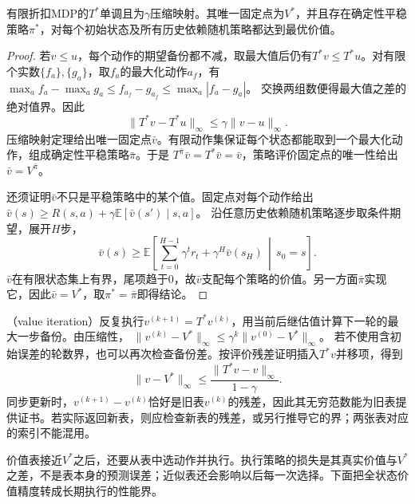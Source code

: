 \begin{theorem}[最优固定点与平稳最优策略]
 \label{thm:rl-planning-optimal-fixed-point}
 有限折扣MDP的$T^*$单调且为$\gamma$压缩映射。其唯一固定点为$V^*$，并且存在确定性平稳策略$\pi^*$，对每个初始状态及所有历史依赖随机策略都达到最优价值。
\end{theorem}
\begin{proof}
 若$v\leq u$，每个动作的期望备份都不减，取最大值后仍有$T^*v\leq T^*u$。对有限个实数$\{f_a\},\{g_a\}$，取$f_a$的最大化动作$a_f$，有
 $\max_a f_a-\max_a g_a\leq f_{a_f}-g_{a_f}\leq\max_a|f_a-g_a|$。
 交换两组数便得最大值之差的绝对值界。因此
 \[
 \lVert T^*v-T^*u\rVert_\infty
 \leq\gamma\lVert v-u\rVert_\infty.
 \]
 压缩映射定理给出唯一固定点$\bar v$。有限动作集保证每个状态都能取到一个最大化动作，组成确定性平稳策略$\bar\pi$。于是
 $T^{\bar\pi}\bar v=T^*\bar v=\bar v$，策略评价固定点的唯一性给出$\bar v=V^{\bar\pi}$。

 还须证明$\bar v$不只是平稳策略中的某个值。固定点对每个动作给出
 $\bar v(s)\geq R(s,a)+\gamma\mathbb E[\bar v(s')\mid s,a]$。
 沿任意历史依赖随机策略逐步取条件期望，展开$H$步，
 \[
 \bar v(s)\geq\mathbb E\!\left[
 \sum_{t=0}^{H-1}\gamma^t r_t+\gamma^H\bar v(s_H)
 \,\middle|\,s_0=s\right].
 \]
 $\bar v$在有限状态集上有界，尾项趋于0，故$\bar v$支配每个策略的价值。另一方面$\bar\pi$实现它，因此$\bar v=V^*$，取$\pi^*=\bar\pi$即得结论。
\end{proof}

（value iteration）反复执行$v^{(k+1)}=T^*v^{(k)}$，用当前后继估值计算下一轮的最大一步备份。由压缩性，
$\lVert v^{(k)}-V^*\rVert_\infty\leq\gamma^k\lVert v^{(0)}-V^*\rVert_\infty$。
若不使用含初始误差的轮数界，也可以再次检查备份差。按评价残差证明插入$T^*v$并移项，得到
\begin{equation}
 \lVert v-V^*\rVert_\infty
 \leq\frac{\lVert T^*v-v\rVert_\infty}{1-\gamma}.
 \label{eq:rl-planning-optimal-residual}
\end{equation}
同步更新时，$v^{(k+1)}-v^{(k)}$恰好是旧表$v^{(k)}$的残差，因此其无穷范数能为旧表提供证书。若实际返回新表，则应检查新表的残差，或另行推导它的界；两张表对应的索引不能混用。

价值表接近$V^*$之后，还要从表中选动作并执行。执行策略的损失是其真实价值与$V^*$之差，不是表本身的预测误差；近似表还会影响以后每一次选择。下面把全状态价值精度转成长期执行的性能界。

